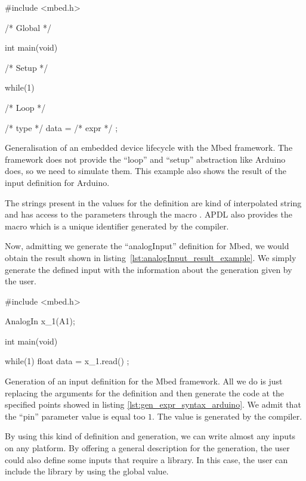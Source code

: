 \begin{listing}[H]
  \centering
\begin{cppcode}
#include <mbed.h>

/* Global */

int main(void){
  /* Setup */

  while(1){
    /* Loop */
    
    /* type */ data = /* expr */ ;
  }
}
\end{cppcode}
  \caption[Generalisation of an embedded device lifecycle with
Mbed]{Generalisation of an embedded device lifecycle with the Mbed framework.
The framework does not provide the ``loop'' and ``setup'' abstraction like
Arduino does, so we need to simulate them. This example also shows the result of
the input definition for Arduino.}
  \label{lst:gen_expr_syntax_mbed}
\end{listing}

The strings present in the values for the  definition are kind
of interpolated string and has access to the parameters through the macro
. \gls{APDL} also provides the macro
 which is a unique identifier generated by the compiler.

Now, admitting we generate the ``analogInput'' definition for Mbed, we would
obtain the result shown in listing~\ref{lst:analogInput_result_example}. We
simply generate the defined input with the information about the generation
given by the user.

\begin{listing}[H]
  \centering
\begin{cppcode}
#include <mbed.h>

AnalogIn x_1(A1);

int main(void){

  while(1){
    float data = x_1.read() ;
  }
}
\end{cppcode}
  \caption[Generation of an input definition for Mbed]{Generation of an input
definition for the Mbed framework. All we do is just replacing the arguments
for the definition and then generate the code at the specified points showed
in listing \ref{lst:gen_expr_syntax_arduino}. We admit that the ``pin''
parameter value is equal too $1$. The  value is generated by the
compiler.}
  \label{lst:analogInput_result_example}
\end{listing}

By using this kind of definition and generation, we can write almost any inputs
on any platform. By offering a general description for the generation, the user
could also define some inputs that require a library. In this case, the user can include
the library by using the global value.

